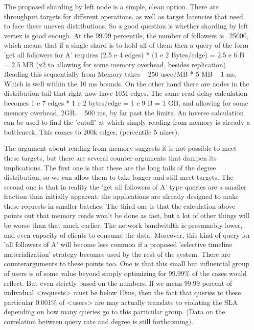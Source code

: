 \documentclass{article}
\begin{document}
The proposed sharding by left node is a simple, clean option. There are throughput targets for different operations, as well as target latencies that need to face these uneven distributions. So a good question is whether sharding by left vertex is good enough. At the 99.99 percentile, the number of followers is ~25000, which means that if a single shard is to hold all of them then a query of the form 'get all followers for A'  requires (2.5 e 4 edges) * (1 e 2 Bytes/edge) = 2.5 e 6 B = 2.5 MB   (x2 to allowing for some memory overhead, besides replication).   Reading this sequentially from Memory takes ~ 250 usec/MB * 5 MB ~ 1 ms. Which is well within the 10 ms bounds.  On the other hand there are nodes in the distribution tail that right now have 10M edges. The same read delay calculation becomes 1 e 7 edges * 1 e 2 bytes/edge = 1 e 9 B = 1 GB, and allowing for some memory overhead, 2GB. ~  500 ms, by far past the limits.  An inverse calculation can be used to find the 'cutoff' at which simply reading from memory is already a bottleneck.  This comes to 200k edges, (percentile 5  nines).

 The argument about reading from memory suggests it is not possible to meet these targets, but there are several counter-arguments that dampen its implications. The first one is that these are the long tails of the degree distribution, so we can allow them to take longer and still meet targets.  The second one is that in reality the 'get all followers of A'  type queries are a smaller fraction than initially apparent: the applications are already designed to make these requests in smaller batches. The third one is that the calculation above points out that memory reads won't be done as fast, but a lot of other things will be worse than that much earlier. The network bandwitdth is presumably lower, and  even capacity of clients to consume the data. Moreover, this kind of query for 'all followers of A' will become less common if a proposed 'selective timeline materialization' strategy becomes used by the rest of the system. There are counterarguments to these points too. One is that this small but influential group of users is of some value beyond simply optimizing for 99.99\% of the cases would reflect. But even strictly based on the numbers. If we mean 99.99 percent of individual <requests> must be below 10ms, then the fact that queries to these particular 0.001\% of <users> are may actually translate to violating the SLA depending on how many queries go to this particular group. (Data on the correlation between query rate and degree is still forthcoming).
\end{document}

